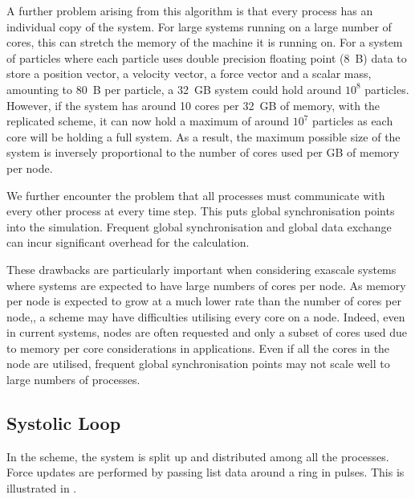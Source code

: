 A further problem arising from this algorithm is that every process has
an individual copy of the system.
%
For large systems running on a large number of cores,
this can stretch the memory of the machine it is running on.
%
For a system of particles where each particle uses double
precision floating point (8~B) data to store
a position vector,
a velocity vector,
a force vector and
a scalar mass,
amounting to 80~B per particle, a 32~GB system could hold around $10^8$
particles.
%
However, if the system has around 10 cores per 32~GB of memory,
with the replicated scheme,
it can now hold a maximum of around $10^7$ particles
as each core will be holding a full system.
%
As a result, the maximum possible size of the system is
inversely proportional to
the number of cores used per GB of memory per node.

We further encounter the problem that all processes must communicate
with every other process at every time step.
%
This puts global synchronisation points into the simulation.
%
Frequent global synchronisation and global data exchange can incur
significant overhead for the calculation.

%
These drawbacks are particularly important when considering exascale systems
where systems are expected to have large numbers of cores per node.
%
As memory per node is expected to grow at a much lower rate than
the number of cores per node,,
a \replicateddata{} scheme may have difficulties utilising every core on a node.
%
Indeed, even in current systems, nodes are often requested and only a
subset of cores used due to memory per core considerations in applications.
%
Even if all the cores in the node are utilised, frequent global synchronisation
points may not scale well to large numbers of processes.



\subsection{Systolic Loop}
\label{sec:background:subsec:systolic_loop}

%
In the \systolicloop{} scheme, the system is split up and distributed among
all the processes.
%
Force updates are performed by passing list data around a ring in pulses.
%
This is illustrated in .

